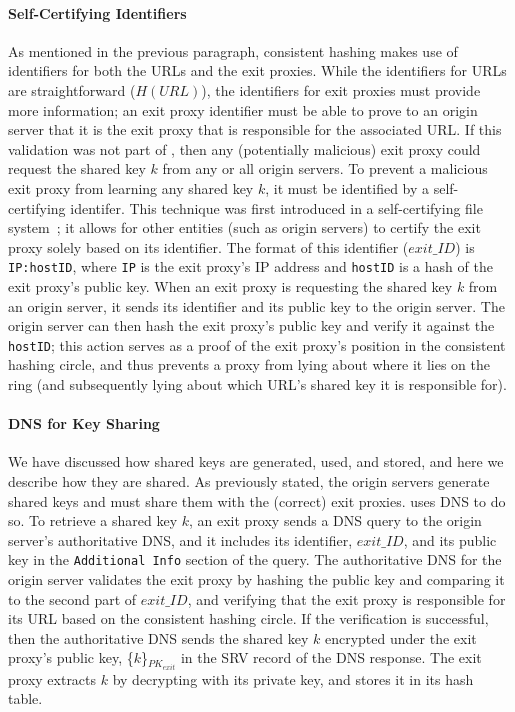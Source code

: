 \paragraph{Self-Certifying Identifiers}
As mentioned in the previous paragraph, consistent hashing makes use of identifiers for both the URLs and 
the exit proxies.  While the identifiers for URLs are straightforward ($H(URL)$), the identifiers for exit 
proxies must provide more information; an exit proxy identifier must be able to prove to an origin server that 
it is the exit proxy that is responsible for the associated URL.  If this validation was not part of \system{}, 
then any (potentially malicious) exit proxy could request the shared key $k$ from any or all origin servers.  To 
prevent a malicious exit proxy from learning any shared key $k$, it must be identified by a self-certifying 
identifer.  This technique was first introduced in a self-certifying file system~\cite{mazieres2000self}; it allows
for other entities (such as origin servers) to certify the exit proxy solely based on its identifier.  The format 
of this identifier ($exit\_ID$) is {\tt IP:hostID}, where {\tt IP} is the exit proxy's IP address and {\tt hostID} 
is a hash of the exit proxy's public key.  When an exit proxy is requesting the shared key $k$ from an origin server, 
it sends its identifier and its public key to the origin server.  The origin server
can then hash the exit proxy's 
public key and verify it against the {\tt hostID}; this action serves as a proof
of the exit proxy's position in the consistent hashing
circle, and thus prevents a proxy from lying about where it lies on the ring (and subsequently lying about which 
URL's shared key it is responsible for).

\paragraph{DNS for Key Sharing}
We have discussed how shared keys are generated, used, and stored, and here we describe how they are shared.  As previously 
stated, the origin servers generate shared keys and must share them with the (correct) exit proxies.  \system{} uses DNS
to do so.  To retrieve a shared key $k$, an exit proxy sends a DNS query to the origin server's authoritative DNS, and 
it includes its identifier, $exit\_ID$, and its public key in the {\tt Additional Info} section of the query.  The 
authoritative DNS for the origin server validates the exit proxy by hashing the public key and comparing it to the 
second part of $exit\_ID$, and verifying that the exit proxy is responsible for its URL based on the consistent 
hashing circle.  If the verification is successful, then the authoritative DNS sends the shared key $k$ encrypted 
under the exit proxy's public key, \{$k$\}$_{PK_{exit}}$ in the SRV record of the DNS response.  The exit proxy 
extracts $k$ by decrypting with its private key, and stores it in its hash table.

